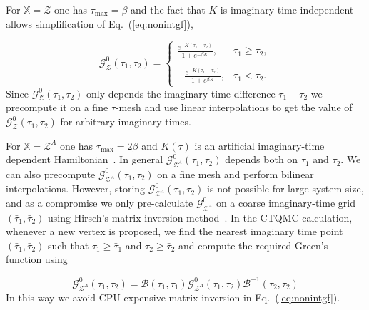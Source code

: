 \documentclass[12pt,onecolumn,english,prl,showpacs,nofootinbib]{revtex4-1}
\begin{document}
For $\mathbb{X} = \mathcal{Z}$ one has $\tau_{\max}=\beta$ and the fact that $K$ is imaginary-time independent allows simplification of Eq.~({\ref{eq:nonintgf}}),  

\begin{equation}
\mathcal{G}^{0}_{\mathcal{Z}}(\tau_{1},\tau_{2})  =\begin{cases}
 \frac{e^{-K(\tau_{1}-\tau_{2})}}{1+e^{- \beta K}}, & \text{$\tau_{1}\ge \tau_{2}$}, \\ \\
    -\frac{e^{-K(\tau_{1}-\tau_{2})}}{1+e^{\beta K}}, & \text{$\tau_{1}< \tau_{2}$}.
  \end{cases}
\end{equation}
Since $\mathcal{G}^{0}_{\mathcal{Z}}(\tau_{1},\tau_{2})$  only depends the imaginary-time difference $\tau_{1}-\tau_{2}$ we precompute it on a fine $\tau$-mesh and use linear interpolations to get the value of $\mathcal{G}^{0}_{\mathcal{Z}}(\tau_{1}, \tau_{2})$ for arbitrary imaginary-times.

For $\mathbb{X} = \mathcal{Z}^{A}$ one has $\tau_{\max}=2\beta$ and $K(\tau)$ is an artificial imaginary-time dependent Hamiltonian~\cite{Broecker:2014ud}. In general $\mathcal{G}^{0}_{\mathcal{Z}^{A}}(\tau_{1}, \tau_{2})$ depends both on $\tau_{1}$ and $\tau_{2}$. We can also precompute $\mathcal{G}^{0}_{\mathcal{Z}^{A}}(\tau_{1}, \tau_{2})$ on a fine mesh and perform bilinear interpolations. However, storing $\mathcal{G}^{0}_{\mathcal{Z}^{A}}(\tau_{1}, \tau_{2})$  is not possible for large system size, and as a compromise we only pre-calculate $\mathcal{G}^{0}_{ \mathcal{Z}^{A}}$ on a 
coarse imaginary-time grid $(\bar{\tau}_{1}, \bar{\tau}_{2}) $ using Hirsch's matrix inversion method~\cite{Hirsch:1988wo}. In the CTQMC calculation, whenever a new vertex is proposed, we find the nearest imaginary time point  $(\bar{\tau}_{1},\bar{\tau}_{2})$ such that $\tau_{1}\ge \bar{\tau}_{1}$ and $\tau_{2}\ge \bar{\tau}_{2}$  and compute the required Green's function using 

\begin{equation}
\mathcal{G}^{0}_{ \mathcal{Z}^{A}}(\tau_{1}, \tau_{2})  =  \mathcal{B}(\tau_{1}, \bar{\tau}_{1}) \mathcal{G}^{0}_{ \mathcal{Z}^{A}}(\bar{\tau}_{1}, \bar{\tau}_{2}) \mathcal{B}^{-1}(\tau_{2}, \bar{\tau}_{2}) 
\end{equation}
In this way we avoid CPU expensive matrix inversion in Eq.~(\ref{eq:nonintgf}). 
\end{document}
